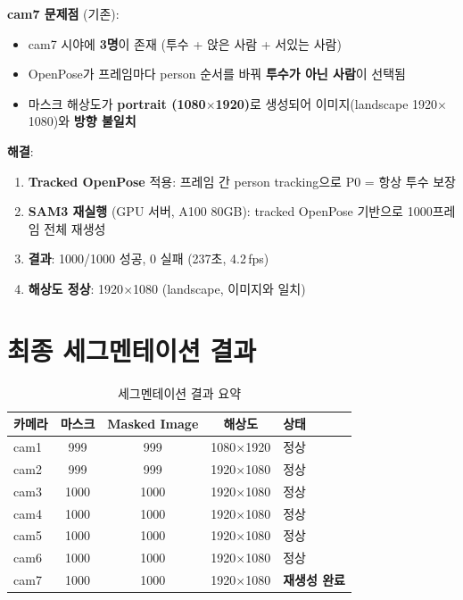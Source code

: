 \documentclass[11pt, a4paper]{report}
\begin{document}
\begin{warningbox}
\textbf{cam7 문제점} (기존):
\begin{itemize}[nosep]
  \item cam7 시야에 \textbf{3명}이 존재 (투수 + 앉은 사람 + 서있는 사람)
  \item OpenPose가 프레임마다 person 순서를 바꿔 \textbf{투수가 아닌 사람}이 선택됨
  \item 마스크 해상도가 \textbf{portrait (1080$\times$1920)}로 생성되어 이미지(landscape 1920$\times$1080)와 \textbf{방향 불일치}
\end{itemize}
\end{warningbox}

\begin{successbox}
\textbf{해결}:
\begin{enumerate}[nosep]
  \item \textbf{Tracked OpenPose} 적용: 프레임 간 person tracking으로 P0 = 항상 투수 보장
  \item \textbf{SAM3 재실행} (GPU 서버, A100 80GB): tracked OpenPose 기반으로 1000프레임 전체 재생성
  \item \textbf{결과}: 1000/1000 성공, 0 실패 (237초, 4.2\,fps)
  \item \textbf{해상도 정상}: 1920$\times$1080 (landscape, 이미지와 일치)
\end{enumerate}
\end{successbox}

\section{최종 세그멘테이션 결과}

\begin{table}[H]
\centering
\caption{세그멘테이션 결과 요약}
\renewcommand{\arraystretch}{1.3}
\begin{tabular}{lcccl}
\toprule
\textbf{카메라} & \textbf{마스크} & \textbf{Masked Image} & \textbf{해상도} & \textbf{상태} \\
\midrule
cam1 & 999 & 999 & 1080$\times$1920 & \textcolor{thmgreen}{정상} \\
cam2 & 999 & 999 & 1920$\times$1080 & \textcolor{thmgreen}{정상} \\
cam3 & 1000 & 1000 & 1920$\times$1080 & \textcolor{thmgreen}{정상} \\
cam4 & 1000 & 1000 & 1920$\times$1080 & \textcolor{thmgreen}{정상} \\
cam5 & 1000 & 1000 & 1920$\times$1080 & \textcolor{thmgreen}{정상} \\
cam6 & 1000 & 1000 & 1920$\times$1080 & \textcolor{thmgreen}{정상} \\
cam7 & 1000 & 1000 & 1920$\times$1080 & \textcolor{thmgreen}{\textbf{재생성 완료}} \\
\bottomrule
\end{tabular}
\end{table}
\end{document}
